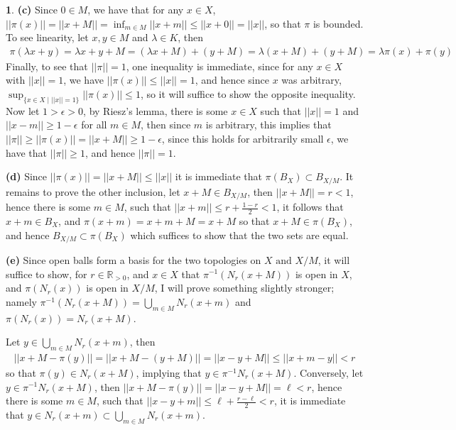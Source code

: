 \documentclass[10.5pt]{article}
\theoremstyle{definition}
\newtheorem{pb}{}
\newcommand{\set}[1]{\{#1\}}
\newcommand{\norm}[1]{\lvert\lvert#1\rvert\rvert}
\newcommand{\tand}{\text{ and }}
\begin{document}
\begin{pb}
            \textbf{(c)} Since \(0 \in M\), we have that for any \(x \in X\), \(\norm{\pi(x)} = \norm{x + M} = \inf_{m \in M}\norm{x + m} \leq \norm{x + 0} = \norm{x}\), so that \(\pi\) is bounded. To see linearity, let \(x,y \in M\) and \(\lambda \in K\), then
            \begin{align*}
                \pi(\lambda x + y) = \lambda x + y + M = (\lambda x + M) + (y + M) = \lambda(x + M) + (y + M) = \lambda\pi(x) + \pi(y)
            \end{align*}
            Finally, to see that \(\norm{\pi} = 1\), one inequality is immediate, since for any \(x \in X\) with \(\norm{x} = 1\), we have \(\norm{\pi(x)} \leq \norm{x} = 1\), and hence since \(x\) was arbitrary, \(\sup_{\set{x \in X \mid \norm{x} = 1}}\norm{\pi(x)} \leq 1\), so it will suffice to show the opposite inequality. Now let \(1 > \epsilon > 0\), by Riesz's lemma, there is some \(x \in X\) such that \(\norm{x} = 1\) and \(\norm{x - m} \geq 1 - \epsilon\) for all \(m \in M\), then since \(m\) is arbitrary, this implies that \(\norm{\pi} \geq \norm{\pi(x)} = \norm{x + M} \geq 1 - \epsilon\), since this holds for arbitrarily small \(\epsilon\), we have that \(\norm{\pi} \geq 1\), and hence \(\norm{\pi} = 1\).

            \textbf{(d)} Since \(\norm{\pi(x)} = \norm{x + M} \leq \norm{x}\) it is immediate that \(\pi(B_X) \subset B_{X/M}\). It remains to prove the other inclusion, let \(x + M \in B_{X/M}\), then \(\norm{x + M} = r < 1\), hence there is some \(m \in M\), such that \(\norm{x + m} \leq r + \frac{1 - r}{2} < 1\), it follows that \(x + m \in B_X\), and \(\pi(x + m) = x + m + M = x + M\) so that \(x + M \in \pi(B_{X})\), and hence \(B_{X/M} \subset \pi(B_X)\) which suffices to show that the two sets are equal.

            \textbf{(e)} Since open balls form a basis for the two topologies on \(X \tand X/M\), it will suffice to show, for \(r \in \mathbb{R}_{> 0}\), and \(x \in X\) that \(\pi^{-1}(N_r(x + M))\) is open in \(X\), and \(\pi(N_r(x))\) is open in \(X/M\), I will prove something slightly stronger; namely \(\pi^{-1}(N_r(x + M)) = \bigcup_{m \in M}N_r(x + m)\) and \(\pi(N_r(x)) = N_r(x + M)\).

            Let \(y \in \bigcup_{m \in M}N_r(x + m)\), then
            \begin{align*}
                \norm{x + M - \pi(y)} = \norm{x + M - (y + M)} = \norm{x - y + M} \leq \norm{x + m - y} < r
            \end{align*}
            so that \(\pi(y) \in N_r(x + M)\), implying that \(y \in \pi^{-1}N_r(x+M)\). Conversely, let \(y \in \pi^{-1}N_r(x + M)\), then \(\norm{x + M - \pi(y)} = \norm{x - y + M} = \ell < r\), hence there is some \(m \in M\), such that \(\norm{x - y + m} \leq \ell + \frac{r - \ell}{2} < r\), it is immediate that \(y \in N_r(x + m) \subset \bigcup_{m \in M} N_r(x + m)\).


\end{pb}
\end{document}
